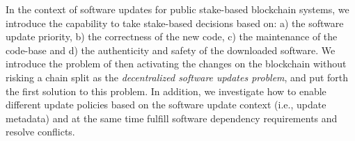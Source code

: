 In the context of software updates for public stake-based blockchain systems, we introduce the capability to take stake-based decisions
 based on: a) the software update priority, b) the correctness of the new code, c) the maintenance of the code-base and d) the authenticity and safety of the downloaded software. We introduce the problem of then activating the changes on the blockchain without risking a chain split
 as the \emph{decentralized software updates problem}, and put forth the first solution to this problem. In addition, we investigate how to enable different update policies based on the software update context (i.e., update metadata) and at the same time fulfill software dependency requirements and resolve conflicts.




